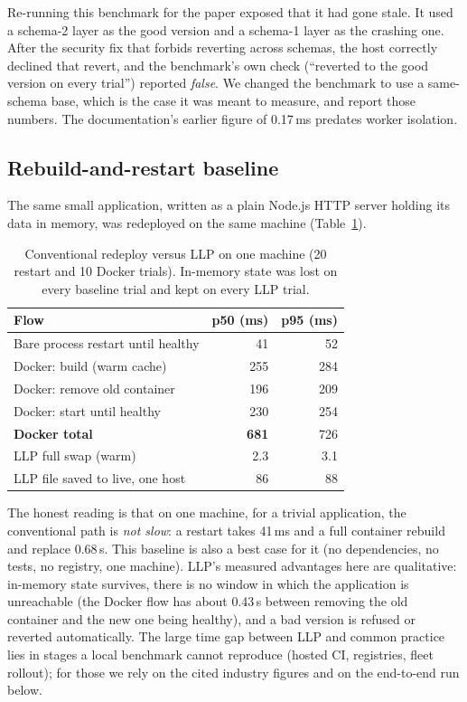 \documentclass[10pt,twocolumn]{article}
\newcommand{\ms}{\,ms\xspace}
\newcommand{\s}{\,s\xspace}
\begin{document}
Re-running this benchmark for the paper exposed that it had gone stale. It used a schema-2 layer
as the good version and a schema-1 layer as the crashing one. After the security fix that forbids
reverting across schemas, the host correctly declined that revert, and the benchmark's own
check (``reverted to the good version on every trial'') reported \emph{false}. We changed the
benchmark to use a same-schema base, which is the case it was meant to measure, and report those
numbers. The documentation's earlier figure of 0.17\ms predates worker isolation.

\subsection{Rebuild-and-restart baseline}
\label{sec:baseline}

The same small application, written as a plain Node.js HTTP server holding its data in memory,
was redeployed on the same machine (Table~\ref{tab:baseline}).

\begin{table}[t]
\centering\footnotesize
\begin{tabular}{@{}lrr@{}}
\toprule
Flow & p50 (ms) & p95 (ms) \\
\midrule
Bare process restart until healthy & 41 & 52 \\
Docker: build (warm cache) & 255 & 284 \\
Docker: remove old container & 196 & 209 \\
Docker: start until healthy & 230 & 254 \\
\textbf{Docker total} & \textbf{681} & 726 \\
\midrule
LLP full swap (warm) & 2.3 & 3.1 \\
LLP file saved to live, one host & 86 & 88 \\
\bottomrule
\end{tabular}
\caption{Conventional redeploy versus LLP on one machine (20 restart and 10 Docker trials).
In-memory state was lost on every baseline trial and kept on every LLP trial.}
\label{tab:baseline}
\end{table}

The honest reading is that on one machine, for a trivial application, the conventional path is
\emph{not slow}: a restart takes 41\ms and a full container rebuild and replace 0.68\s. This
baseline is also a best case for it (no dependencies, no tests, no registry, one machine). LLP's
measured advantages here are qualitative: in-memory state survives, there is no window in which
the application is unreachable (the Docker flow has about 0.43\s between removing the old
container and the new one being healthy), and a bad version is refused or reverted automatically.
The large time gap between LLP and common practice lies in stages a local benchmark cannot
reproduce (hosted CI, registries, fleet rollout); for those we rely on the cited industry figures
and on the end-to-end run below.
\end{document}
